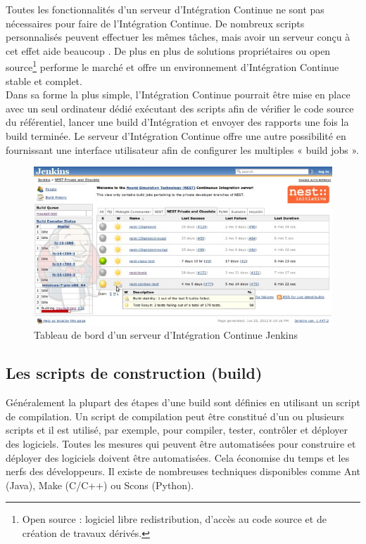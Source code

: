 \documentclass{report}
\begin{document}
      Toutes les fonctionnalités d’un serveur d’Intégration Continue ne sont pas nécessaires pour faire de l’Intégration Continue. De nombreux scripts personnalisés peuvent effectuer les mêmes tâches, mais avoir un serveur conçu à cet effet aide beaucoup \cite{Duv07}. De plus en plus de solutions propriétaires ou open source\footnote{Open source : logiciel libre redistribution, d'accès au code source et de création de travaux dérivés.}  performe le marché et offre un environnement d’Intégration Continue stable et complet.\\

      Dans sa forme la plus simple, l’Intégration Continue pourrait être mise en place avec un seul ordinateur dédié exécutant des scripts afin de vérifier le code source du référentiel, lancer une build d’Intégration et envoyer des rapports une fois la build terminée. Le serveur d’Intégration Continue offre une autre possibilité en fournissant une interface utilisateur afin de configurer les multiples « build jobs ».

      \begin{figure}
        \begin{center}
          \includegraphics[scale=0.5]{images/jenkinsBuildJobs.png}
        \end{center}
        \caption{Tableau de bord d'un serveur d'Intégration Continue Jenkins}
        \label{Jenkins build jobs}
      \end{figure}

      \subsection{Les scripts de construction (build)}
      Généralement la plupart des étapes d’une build sont définies en utilisant un script de compilation. Un script de compilation peut être constitué d'un ou plusieurs scripts et il est utilisé, par exemple, pour compiler, tester, contrôler et déployer des logiciels. Toutes les mesures qui peuvent être automatisées pour construire et déployer des logiciels doivent être automatisées. Cela économise du temps et les nerfs des développeurs. Il existe de nombreuses techniques disponibles comme Ant (Java), Make (C/C++) ou Scons (Python).\\
\end{document}
